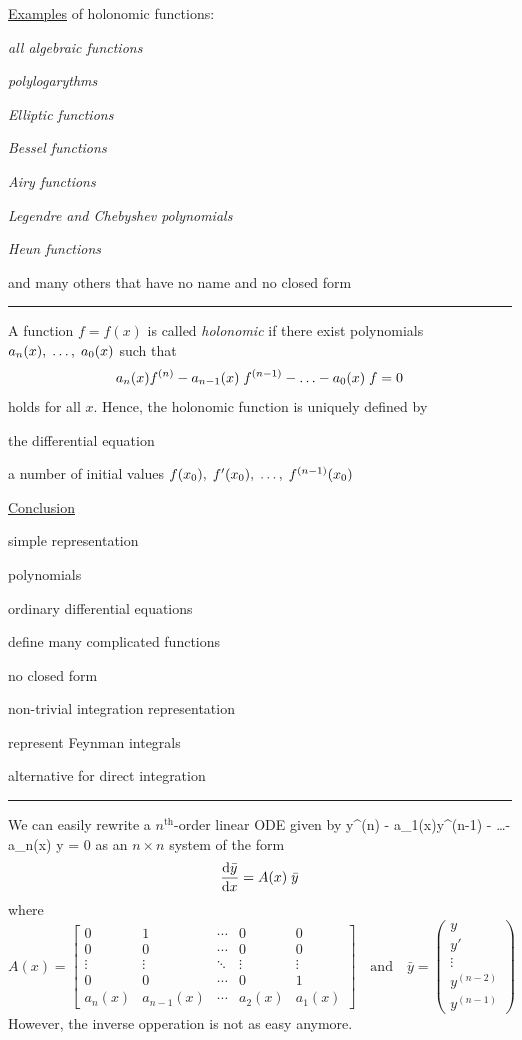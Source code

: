 \documentclass[11pt]{article}
\newcommand{\titleb}[2]{{\color{Blue}{\LARGE #1}\hfill{\Large #2}\vspace{-2mm}\par\rule{\textwidth}{1pt}\vs}}
\newcommand{\titlea}[1]{\titleb{#1}{}}
\begin{document}
\vs
\underline{Examples} of holonomic functions:
\bi
  \item {\em all algebraic functions}
  \item {}
    \bi
      \item {\em polylogarythms}
      \item {\em Elliptic functions}
    \ei
  \item {\em Bessel functions}
  \item {\em Airy functions}
  \item {\em Legendre and Chebyshev polynomials}
  \item {\em Heun functions}
  \item and many others that have no name and no closed form
\ei
\newpage

\titlea{Holonomic Functions}
A function $f=f(x)$ is called {\em holonomic} if there exist polynomials $a_n(x),\;\ldots,\; a_0(x)$ such that
$$
  a_n(x) f^{(n)} - a_{n-1}(x)\; f^{(n-1)} - \ldots - a_0(x) \; f = 0
$$%
holds for all $x$. Hence, the holonomic function is uniquely defined by
\bi
  \item the differential equation
  \item a number of initial values $f(x_0),\; f'(x_0),\; \ldots,\; f^{(n-1)}(x_0)$
\ei


\vs
\underline{Conclusion}
\bi
  \item simple representation
  \bi
    \item polynomials
    \item ordinary differential equations
  \ei
  \item define many complicated functions
  \bi
    \item no closed form
    \item non-trivial integration representation
  \ei
  \item represent Feynman integrals
  \item alternative for direct integration
\ei
\newpage


\titlea{Systems of ODE}

We can easily rewrite a $n^{\text{th}}$-order linear ODE given by
\be
  \label{eq:ode}
  y^{(n)} - a_1(x)\x y^{(n-1)} - \ldots - a_n(x) \x y = 0
\ee
as an $n\times n$ system of the form 
$$ \frac{\mathrm{d} \bar{y}}{\mathrm{d} x} = A(x) \; \bar{y} $$%
where
$$
A(x) =
\begin{bmatrix}
  0 & 1 & \cdots & 0 & 0
  \\
  0 & 0 & \cdots & 0 & 0
  \\
  \vdots & \vdots & \ddots & \vdots & \vdots
  \\
  0 & 0 & \cdots & 0 & 1
  \\
  a_n(x) & a_{n-1}(x) & \cdots & a_2(x) & a_1(x)
\end{bmatrix}
\quad \text{and} \quad
\bar{y} =
\begin{pmatrix}
  y \\ y' \\ \vdots \\ y^{(n-2)} \\ y^{(n-1)}
 \end{pmatrix}
$$%
However, the inverse opperation is not as easy anymore.
\newpage
\end{document}
